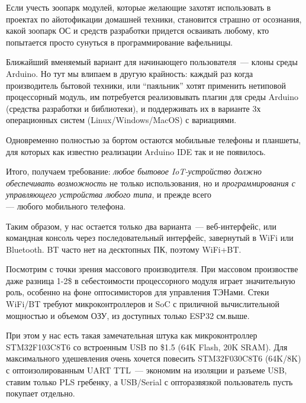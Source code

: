 Если учесть зоопарк модулей, которые желающие захотят использовать в проектах по
айотофикации домашней техники, становится страшно
от осознания, какой зоопарк ОС и средств разработки придется осваивать любому,
кто попытается просто сунуться в программирование вафельницы.

Ближайший вменяемый вариант для начинающего пользователя\ --- клоны среды
Arduino. Но тут мы влипаем в другую крайность: каждый раз когда производитель
бытовой техники, или ``паяльник'' хотят применить нетиповой процессорный модуль,
им потребуется реализовывать плагин для среды Arduino (средства разработки и
библиотеки), и поддерживать их в варианте 3х операционных систем
(Linux/Windows/MacOS) с вариациями.

Одновременно полностью за бортом остаются мобильные телефоны и планшеты, для
которых как известно реализации Arduino IDE так и не появилось.

\begin{framed}\noindent
Итого, получаем требование: \emph{любое бытовое IoT-устройство должно
обеспечивать возможность} не только использования, но и \emph{программирования с
управляющего устройства любого типа}, и прежде всего\\ --- любого мобильного
телефона.
\end{framed}

Таким образом, у нас остается только два варианта\ --- веб-интерфейс, или
командная консоль через последовательный интерфейс, завернутый в WiFi или
Bluetooth. BT часто нет на десктопных ПК, поэтому WiFi+BT.

Посмотрим с точки зрения массового производителя. При массовом произвостве даже
разница 1-2\$ в себестоимости процессорного модуля играет значительную роль,
особенно на фоне оптосимисторов для управления ТЭНами. Стеки WiFi/BT требуют
микроконтроллеров и SoC с приличной вычислительной мощностью и объемом ОЗУ, из
доступных только ESP32 см.выше.

При этом у нас есть такая замечательная штука как микроконтроллер STM32F103C8T6
со встроенным USB по \$1.5 (64K Flash, 20K SRAM). Для максимального удешевления
очень хочется повесить STM32F030C8T6 (64K/8K) с оптоизолированным UART TTL\ ---
экономим на изоляции и разъеме USB, ставим только PLS гребенку, а USB/Serial с
опторазвязкой пользователь пусть покупает отдельно.

